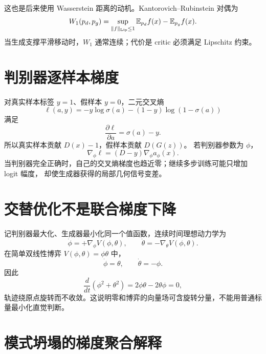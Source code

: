 \documentclass[11pt]{article}
\numberwithin{equation}{section}
\newcommand{\E}{\mathbb{E}}
\newcommand{\1}{\mathbf{1}}
\begin{document}
这也是后来使用 Wasserstein 距离的动机。Kantorovich--Rubinstein 对偶为
\begin{equation}
 W_1(p_d,p_g)=\sup_{\|f\|_{\rm Lip}\le1}
 \E_{p_d}f(x)-\E_{p_g}f(x).
\end{equation}
当生成支撑平滑移动时，$W_1$ 通常连续；代价是 critic 必须满足 Lipschitz 约束。

\section{判别器逐样本梯度}

对真实样本标签 $y=1$、假样本 $y=0$，二元交叉熵
\begin{equation}
 \ell(a,y)=-y\log\sigma(a)-(1-y)\log(1-\sigma(a))
\end{equation}
满足
\begin{equation}
 \frac{\partial\ell}{\partial a}=\sigma(a)-y.
\end{equation}
所以真实样本贡献 $D(x)-1$，假样本贡献 $D(G(z))$。
若判别器参数为 $\phi$，
\begin{equation}
 \nabla_\phi\ell=(D-y)\nabla_\phi a_\phi(x).
\end{equation}
当判别器完全正确时，自己的交叉熵梯度也趋近零；继续多步训练可能只增加 logit 幅度，
却使生成器获得的局部几何信号变差。

\section{交替优化不是联合梯度下降}

记判别器最大化、生成器最小化同一个值函数，连续时间理想动力学为
\begin{equation}
 \dot\phi=+\nabla_\phi V(\phi,\theta),
 \qquad
 \dot\theta=-\nabla_\theta V(\phi,\theta).
\end{equation}
在简单双线性博弈 $V(\phi,\theta)=\phi\theta$ 中，
\begin{equation}
 \dot\phi=\theta,\qquad \dot\theta=-\phi.
\end{equation}
因此
\begin{equation}
 \frac d{dt}(\phi^2+\theta^2)=2\phi\theta-2\theta\phi=0,
\end{equation}
轨迹绕原点旋转而不收敛。这说明零和博弈的向量场可含旋转分量，不能用普通标量最小化直觉判断。

\section{模式坍塌的梯度聚合解释}
\end{document}
